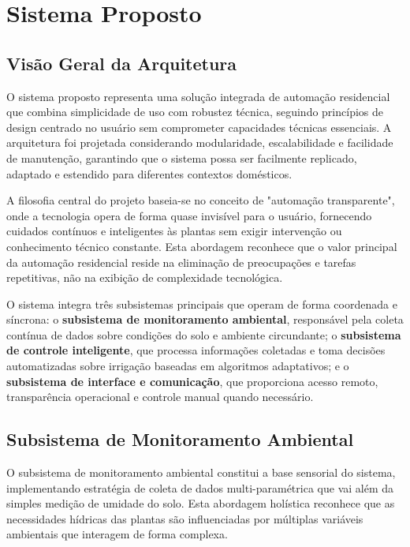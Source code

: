 \documentclass[twoside,english,brazilian]{UNISINOSmonografia}
\begin{document}
\chapter{Sistema Proposto}

\section{Visão Geral da Arquitetura}

O sistema proposto representa uma solução integrada de automação residencial que combina simplicidade de uso com robustez técnica, seguindo princípios de design centrado no usuário sem comprometer capacidades técnicas essenciais. A arquitetura foi projetada considerando modularidade, escalabilidade e facilidade de manutenção, garantindo que o sistema possa ser facilmente replicado, adaptado e estendido para diferentes contextos domésticos.

A filosofia central do projeto baseia-se no conceito de "automação transparente", onde a tecnologia opera de forma quase invisível para o usuário, fornecendo cuidados contínuos e inteligentes às plantas sem exigir intervenção ou conhecimento técnico constante. Esta abordagem reconhece que o valor principal da automação residencial reside na eliminação de preocupações e tarefas repetitivas, não na exibição de complexidade tecnológica.


O sistema integra três subsistemas principais que operam de forma coordenada e síncrona: o \textbf{subsistema de monitoramento ambiental}, responsável pela coleta contínua de dados sobre condições do solo e ambiente circundante; o \textbf{subsistema de controle inteligente}, que processa informações coletadas e toma decisões automatizadas sobre irrigação baseadas em algoritmos adaptativos; e o \textbf{subsistema de interface e comunicação}, que proporciona acesso remoto, transparência operacional e controle manual quando necessário.

\section{Subsistema de Monitoramento Ambiental}

O subsistema de monitoramento ambiental constitui a base sensorial do sistema, implementando estratégia de coleta de dados multi-paramétrica que vai além da simples medição de umidade do solo. Esta abordagem holística reconhece que as necessidades hídricas das plantas são influenciadas por múltiplas variáveis ambientais que interagem de forma complexa.
\end{document}
